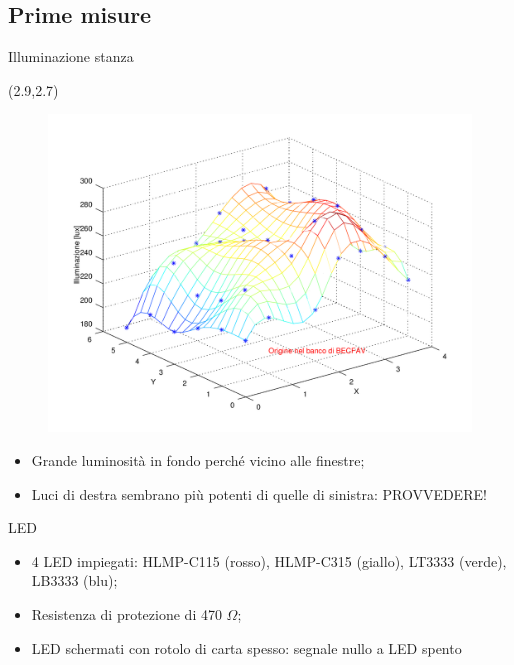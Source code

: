 \documentclass{beamer}
\begin{document}
\subsection{Prime misure}

\begin{frame}{Illuminazione stanza}
\begin{textblock}{9}(2.9,2.7)
\begin{figure}
\includegraphics[scale=.4]{mesh}
\end{figure}
\end{textblock}
\end{frame}

\begin{frame}
\begin{itemize}
\item Grande luminosità in fondo perché vicino alle finestre;
\item Luci di destra sembrano più potenti di quelle di sinistra: PROVVEDERE!
\end{itemize}
\end{frame}

\begin{frame}{LED}
\begin{itemize}
\item 4 LED impiegati: HLMP-C115 (rosso), HLMP-C315 (giallo), LT3333 (verde), LB3333 (blu);\\
\item Resistenza di protezione di 470 $\Omega$;\\
\item LED schermati con rotolo di carta spesso: segnale nullo a LED spento
\end{itemize}
\end{frame}
\end{document}
